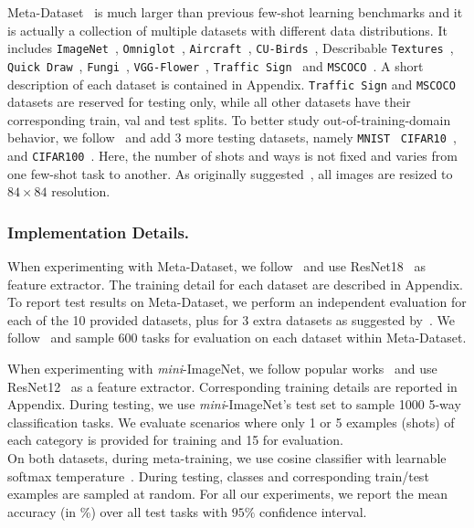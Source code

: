 \documentclass[runningheads]{llncs}
\begin{document}
Meta-Dataset~\cite{triantafillou2019meta} is much larger than previous few-shot
learning benchmarks and it is actually a collection of multiple
datasets with different data distributions.
It includes 
\texttt{ImageNet}~\cite{imagenet}, \texttt{Omniglot}~\cite{lake2015human},
\texttt{Aircraft}~\cite{maji13fine-grained},
\texttt{CU-Birds}~\cite{wah2011caltech}, Describable
\texttt{Textures}~\cite{cimpoi2014describing}, \texttt{Quick
Draw}~\cite{quickdraw}, \texttt{Fungi}~\cite{fungi},
\texttt{VGG-Flower}~\cite{nilsback2008automated}, \texttt{Traffic
Sign}~\cite{houben2013detection} and \texttt{MSCOCO}~\cite{coco}. A short
description of each dataset is contained in Appendix.
\texttt{Traffic Sign} and \texttt{MSCOCO} datasets are reserved for testing
only, while all other datasets have their corresponding train, val and test
splits. To better study out-of-training-domain behavior, we
follow~\cite{requeima2019fast} and add 3 more testing datasets, namely
\texttt{MNIST}~\cite{mnist} \texttt{CIFAR10}~\cite{krizhevsky2009learning}, and
\texttt{CIFAR100}~\cite{krizhevsky2009learning}. Here, the number of shots and
ways is not fixed and varies from one few-shot task to another. As originally
suggested~\cite{triantafillou2019meta}, all images are
resized to $84 \times 84$ resolution.

\subsubsection{Implementation Details.}
When experimenting with Meta-Dataset, we
follow~\cite{requeima2019fast} and use ResNet18~\cite{resnet} as feature
extractor. The training detail for each dataset are described in Appendix.
To report test results on Meta-Dataset, we perform an independent evaluation
for each of the 10 provided datasets, plus for 3 extra datasets as suggested
by~\cite{requeima2019fast}. We follow~\cite{triantafillou2019meta} and sample
600 tasks for evaluation on each dataset within Meta-Dataset.

When experimenting with \textit{mini}-ImageNet, we follow popular
works~\cite{gidaris2019boosting,lifchitz2019dense,oreshkin2018tadam} and use
ResNet12~\cite{oreshkin2018tadam} as a feature extractor. Corresponding training
details are reported in Appendix. During testing, we use
\textit{mini}-ImageNet's test set to sample 1000 5-way classification tasks. We
evaluate scenarios where only 1 or 5 examples (shots) of each category is
provided for training and 15 for evaluation.
\\
On both datasets, during meta-training, we use cosine classifier with learnable
softmax temperature~\cite{chen19closerfewshot}. During testing, classes and
corresponding train/test examples are sampled at random. For all our
experiments, we report the mean accuracy (in \%) over all test tasks with $95
\%$ confidence interval.
\end{document}
